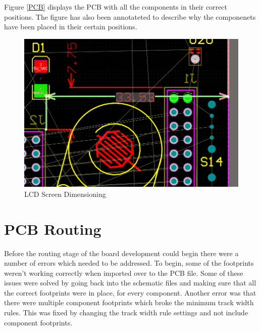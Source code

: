 	Figure \ref{PCB} displays the PCB with all the components in their correct positions. 
The figure has also been annotateted to describe why the componenets have been placed in their certain positions. 

\begin{figure}
	\includegraphics[width=\linewidth]{Figures/component_placement.png}\centering
	\caption{LCD Screen Dimensioning}
	\label{fig:component_placement}
\end{figure}



\section{PCB Routing}
\label{chap6sec6}

	Before the routing stage of the board development could begin there were a number of errors which needed to be addressed. 
To begin, some of the footprints weren't working correctly when imported over to the PCB file. 
Some of these issues were solved by going back into the schematic files and making sure that all the correct footprints were in place, for every component. 
Another error was that there were multiple component footprints which broke the minimum track width rules. 
This was fixed by changing the track width rule settings and not include component footprints.


